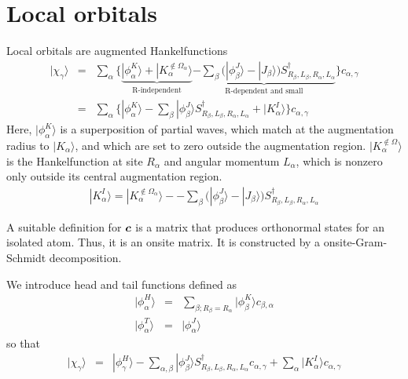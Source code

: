\documentclass[11pt,a4paper]{report}
\begin{document}
\section{Local orbitals}
Local orbitals are augmented Hankelfunctions
\begin{eqnarray}
|\chi_\gamma\rangle&=&
\sum_\alpha \biggl\lbrace
\underbrace{
|\phi^{K}_{\alpha}\rangle+ |K^{\notin\Omega_\alpha}_\alpha\rangle
}_{\text{R-independent}}
\underbrace{
-\sum_{\beta}
\biggl(|\phi^J_{\beta}\rangle -|J_{\beta}\rangle\biggr)
S^\dagger_{R_\beta,L_\beta,R_\alpha,L_\alpha}}_{\text{R-dependent and small}}
\biggr\rbrace c_{\alpha,\gamma}
\nonumber\\
&=&\sum_\alpha \biggl\lbrace
|\phi^{K}_{\alpha}\rangle
-\sum_{\beta}
|\phi^J_{\beta}\rangle S^\dagger_{R_\beta,L_\beta,R_\alpha,L_\alpha}
+ |K^{I}_\alpha\rangle
\biggr\rbrace c_{\alpha,\gamma}
\end{eqnarray}
Here, $|\phi^K_\alpha\rangle$ is a superposition of partial waves,
which match at the augmentation radius to $|K_\alpha\rangle$, and
which are set to zero outside the augmentation region.
$|K^{\notin\Omega}_\alpha\rangle$ is the Hankelfunction at site
$R_\alpha$ and angular momentum $L_\alpha$, which is nonzero only
outside its central augmentation region.
\begin{eqnarray}
|K^I_\alpha\rangle= |K^{\notin\Omega_\alpha}_\alpha\rangle-
-\sum_{\beta}
\biggl(|\phi^J_{\beta}\rangle -|J_{\beta}\rangle\biggr)
S^\dagger_{R_\beta,L_\beta,R_\alpha,L_\alpha}
\end{eqnarray}


A suitable definition for $\bm{c}$ is a matrix that produces
orthonormal states for an isolated atom. Thus, it is an onsite matrix.
It is constructed by a onsite-Gram-Schmidt decomposition.


We introduce head and tail functions defined as
\begin{eqnarray}
|\phi^H_\alpha\rangle&=&\sum_{\beta; R_\beta=R_\alpha}
|\phi^K_\beta\rangle c_{\beta,\alpha}
\nonumber\\
|\phi^T_\alpha\rangle&=&|\phi^J_\alpha\rangle
\end{eqnarray}
so that
\begin{eqnarray}
|\chi_\gamma\rangle&=&
|\phi^{H}_{\gamma}\rangle
-\sum_{\alpha,\beta}
|\phi^J_{\beta}\rangle S^\dagger_{R_\beta,L_\beta,R_\alpha,L_\alpha}
c_{\alpha,\gamma}
+\sum_\alpha |K^{I}_\alpha\rangle c_{\alpha,\gamma}
\end{eqnarray}
\end{document}
